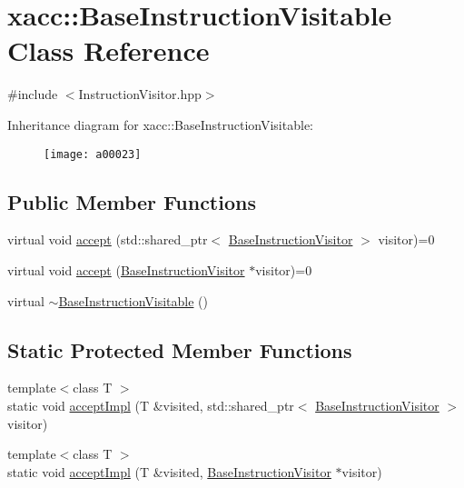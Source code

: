 \hypertarget{a00023}{}\section{xacc\+:\+:Base\+Instruction\+Visitable Class Reference}
\label{a00023}


{\ttfamily \#include $<$Instruction\+Visitor.\+hpp$>$}

Inheritance diagram for xacc\+:\+:Base\+Instruction\+Visitable\+:\begin{figure}[H]
\begin{center}
\leavevmode
\texttt{[image: a00023]}
\end{center}
\end{figure}
\subsection*{Public Member Functions}
\begin{DoxyCompactItemize}
\item 
virtual void \hyperlink{a00023_a4ae295a7f83d57c6f1f912adc90274ea}{accept} (std\+::shared\+\_\+ptr$<$ \hyperlink{a00024}{Base\+Instruction\+Visitor} $>$ visitor)=0
\item 
virtual void \hyperlink{a00023_ad6b9ad95c14580cc86ca87cd464262c3}{accept} (\hyperlink{a00024}{Base\+Instruction\+Visitor} $\ast$visitor)=0
\item 
virtual \hyperlink{a00023_a3a291d247b18ea7620dd8d97dfb595f4}{$\sim$\+Base\+Instruction\+Visitable} ()
\end{DoxyCompactItemize}
\subsection*{Static Protected Member Functions}
\begin{DoxyCompactItemize}
\item 
{\footnotesize template$<$class T $>$ }\\static void \hyperlink{a00023_a2f18b9fcb48f42d190a9f5180b7b59c5}{accept\+Impl} (T \&visited, std\+::shared\+\_\+ptr$<$ \hyperlink{a00024}{Base\+Instruction\+Visitor} $>$ visitor)
\item 
{\footnotesize template$<$class T $>$ }\\static void \hyperlink{a00023_a80c7bb995faa54644f822fa48176c6cb}{accept\+Impl} (T \&visited, \hyperlink{a00024}{Base\+Instruction\+Visitor} $\ast$visitor)
\end{DoxyCompactItemize}


